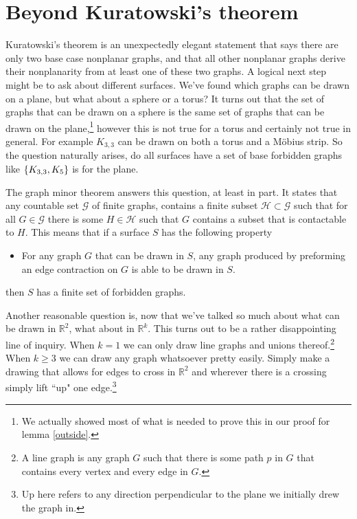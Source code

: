 \documentclass{article}
\begin{document}
\section{Beyond Kuratowski's theorem}
Kuratowski's theorem is an unexpectedly elegant statement that says there are only two base case nonplanar graphs, and that all other nonplanar graphs derive their nonplanarity from at least one of these two graphs. A logical next step might be to ask about different surfaces. We've found which graphs can be drawn on a plane, but what about a sphere or a torus? It turns out that the set of graphs that can be drawn on a sphere is the same set of graphs that can be drawn on the plane,\footnote{We actually showed most of what is needed to prove this in our proof for lemma \ref{outside}.} however this is not true for a torus and certainly not true in general. For example $K_{3,3}$ can be drawn on both a torus and a M\"obius strip. So the question naturally arises, do all surfaces have a set of base forbidden graphs like $\left\{ {K_{3,3},K_5} \right\}$ is for the plane.

The graph minor theorem answers this question, at least in part. It states that any countable set $\mathcal G$ of finite graphs, contains a finite subset $\mathcal H\subset\mathcal G$ such that for all $G\in\mathcal G$ there is some $H\in\mathcal H$ such that $G$ contains a subset that is contactable to $H$. %
This means that if a surface $S$ has the following property
\begin{itemize}
	\item For any graph $G$ that can be drawn in $S$, any graph produced by preforming an edge contraction on $G$ is able to be drawn in $S$.
\end{itemize}
then $S$ has a finite set of forbidden graphs.

Another reasonable question is, now that we've talked so much about what can be drawn in $\mathbb R^2$, what about in $\mathbb R^k$. This turns out to be a rather disappointing line of inquiry. When $k=1$ we can only draw line graphs and unions thereof.\footnote{A line graph is any graph $G$ such that there is some path $p$ in $G$ that contains every vertex and every edge in $G$.} When $k\ge 3$ we can draw any graph whatsoever pretty easily. Simply make a drawing that allows for edges to cross in $\mathbb R^2$ and wherever there is a crossing simply lift ``up" one edge.\footnote{Up here refers to any direction perpendicular to the plane we initially drew the graph in.}
\end{document}
